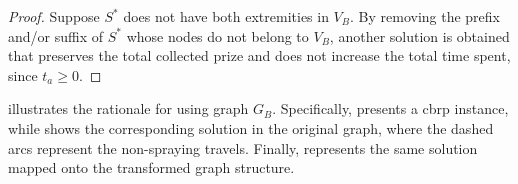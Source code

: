 \begin{proof}
	Suppose $S^{*}$ does not have both extremities in $V_B$. By removing the
	prefix and/or suffix of $S^{*}$ whose nodes do not belong to $V_B$,
	another solution is obtained that preserves the total collected prize and does
	not increase the total time spent, since $t_a \geqslant 0$.
\end{proof}

 illustrates the rationale for using
graph $G_B$. Specifically,  presents a
\gls{cbrp} instance, while  shows the
corresponding solution in the original graph, where the dashed arcs represent
the non-spraying travels. Finally, 
represents the same solution mapped onto the transformed graph structure.

